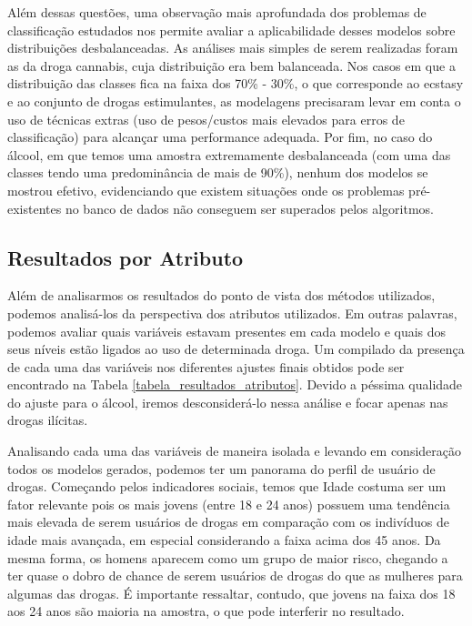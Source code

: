 \documentclass[
	article,			%
	11pt,				%
	oneside,			%
	a4paper,			%
	english,			%
	brazil,				%
	sumario=tradicional
	]{abntex2}
\begin{document}
Além dessas questões, uma observação mais aprofundada dos problemas de classificação estudados nos permite avaliar a aplicabilidade desses modelos sobre distribuições desbalanceadas. As análises mais simples de serem realizadas foram as da droga cannabis, cuja distribuição era bem balanceada. Nos casos em que a distribuição das classes fica na faixa dos 70\% - 30\%, o que corresponde ao ecstasy e ao conjunto de drogas estimulantes, as modelagens precisaram levar em conta o uso de técnicas extras (uso de pesos/custos mais elevados para erros de classificação) para alcançar uma performance adequada. Por fim, no caso do álcool, em que temos uma amostra extremamente desbalanceada (com uma das classes tendo uma predominância de mais de 90\%), nenhum dos modelos se mostrou efetivo, evidenciando que existem situações onde os problemas pré-existentes no banco de dados não conseguem ser superados pelos algoritmos.

\subsection{Resultados por Atributo}

Além de analisarmos os resultados do ponto de vista dos métodos utilizados, podemos analisá-los da perspectiva dos atributos utilizados. Em outras palavras, podemos avaliar quais variáveis estavam presentes em cada modelo e quais dos seus níveis estão ligados ao uso de determinada droga. Um compilado da presença de cada uma das variáveis nos diferentes ajustes finais obtidos pode ser encontrado na Tabela \ref{tabela_resultados_atributos}. Devido a péssima qualidade do ajuste para o álcool, iremos desconsiderá-lo nessa análise e focar apenas nas drogas ilícitas.



Analisando cada uma das variáveis de maneira isolada e levando em consideração todos os modelos gerados, podemos ter um panorama do perfil de usuário de drogas. Começando pelos indicadores sociais, temos que Idade costuma ser um fator relevante pois os mais jovens (entre 18 e 24 anos) possuem uma tendência mais elevada de serem usuários de drogas em comparação com os indivíduos de idade mais avançada, em especial considerando a faixa acima dos 45 anos. Da mesma forma, os homens aparecem como um grupo de maior risco, chegando a ter quase o dobro de chance de serem usuários de drogas do que as mulheres para algumas das drogas. É importante ressaltar, contudo, que jovens na faixa dos 18 aos 24 anos são maioria na amostra, o que pode interferir no resultado.
\end{document}

